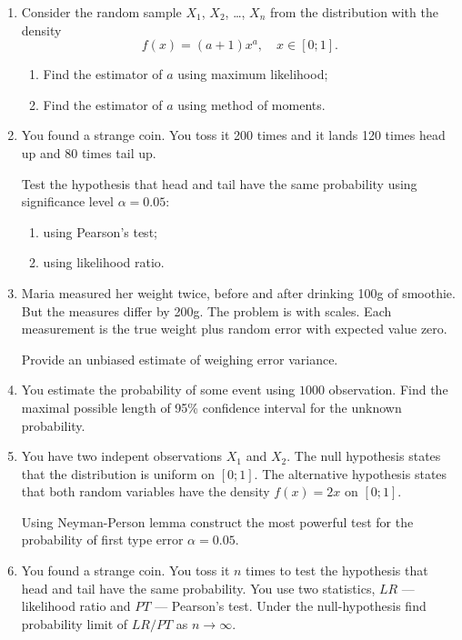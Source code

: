 \documentclass[12pt]{article}
\begin{document}


\begin{enumerate}

\item Consider the random sample $X_1$, $X_2$, \ldots, $X_n$ from the distribution with the density
\[
f(x) =  (a+1)x^a, \quad x\in [0;1].
\]

\begin{enumerate}
  \item Find the estimator of $a$ using maximum likelihood;
  \item Find the estimator of $a$ using method of moments.
\end{enumerate}

\item You found a strange coin. You toss it 200 times and it lands 120 times head up and 80 times tail up. 

Test the hypothesis that head and tail have the same probability using significance level $\alpha = 0.05$:
\begin{enumerate}
    \item using Pearson's test;
    \item using likelihood ratio.
\end{enumerate}
  

\item 
Maria measured her weight twice, before and after drinking 100g of smoothie. 
But the measures differ by 200g. The problem is with scales. Each measurement is the true weight plus 
random error with expected value zero. 

Provide an unbiased estimate of weighing error variance.  


\item You estimate the probability of some event using $1000$ observation. 
Find the maximal possible length of 95\% confidence interval for the unknown probability. 

\item You have two indepent observations $X_1$ and $X_2$. 
The null hypothesis states that the distribution is uniform on $[0;1]$. 
The alternative hypothesis states that both random variables have the density $f(x)=2x$ on $[0;1]$.

Using Neyman-Person lemma construct the most powerful test for the probability of first type error $\alpha = 0.05$.



\item You found a strange coin. You toss it $n$ times to test the hypothesis that head and tail have the same probability.
You use two statistics, $LR$ — likelihood ratio and $PT$ — Pearson's test. Under the null-hypothesis find 
probability limit of $LR/PT$ as $n\to \infty$.



\end{enumerate}
\end{document}
